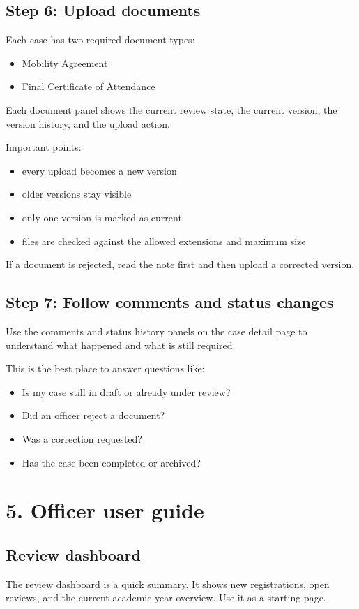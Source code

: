 \documentclass[11pt,a4paper]{article}
\begin{document}
\subsection*{Step 6: Upload documents}
Each case has two required document types:

\begin{itemize}
  \item Mobility Agreement
  \item Final Certificate of Attendance
\end{itemize}

Each document panel shows the current review state, the current version, the version history, and the upload action.

Important points:

\begin{itemize}
  \item every upload becomes a new version
  \item older versions stay visible
  \item only one version is marked as current
  \item files are checked against the allowed extensions and maximum size
\end{itemize}

If a document is rejected, read the note first and then upload a corrected version.

\subsection*{Step 7: Follow comments and status changes}
Use the comments and status history panels on the case detail page to understand what happened and what is still required.

This is the best place to answer questions like:

\begin{itemize}
  \item Is my case still in draft or already under review?
  \item Did an officer reject a document?
  \item Was a correction requested?
  \item Has the case been completed or archived?
\end{itemize}

\section*{5. Officer user guide}
\subsection*{Review dashboard}
The review dashboard is a quick summary. It shows new registrations, open reviews, and the current academic year overview. Use it as a starting page.
\end{document}
